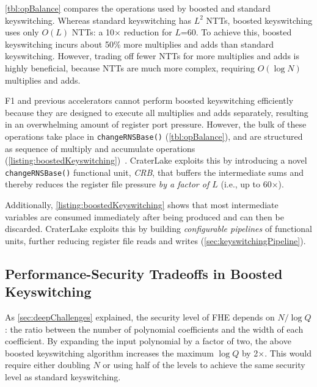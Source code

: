 \autoref{tbl:opBalance} compares the operations used by boosted and standard
keyswitching. Whereas standard keyswitching has $L^2$ NTTs, boosted
keyswitching uses only $O(L)$ NTTs: a 10$\times$ reduction for $L$=60. To
achieve this, boosted keyswitching incurs about 50\% more multiplies and adds
than standard keyswitching. However, trading off fewer NTTs for more multiplies
and adds is highly beneficial, because NTTs are much more complex, requiring
$O(\log N)$ multiplies and adds.

F1 and previous accelerators cannot perform boosted keyswitching efficiently
because they are designed to execute all multiplies and adds separately,
resulting in an overwhelming amount of register port pressure. However, the
bulk of these \mbox{operations} take place in \verb!changeRNSBase()!
(\autoref{tbl:opBalance}), and are structured as sequence of multiply and
accumulate operations
(\autoref{listing:boostedKeyswitching})~\cite{bajard:2016:full}. CraterLake
exploits this by introducing a novel \verb!changeRNSBase()! functional unit,
\emph{CRB}, that buffers the intermediate sums and thereby reduces the register
file pressure \emph{by a factor of $L$} (i.e., up to 60$\times$).

Additionally, \autoref{listing:boostedKeyswitching} shows that most
intermediate variables are consumed immediately after being produced and can
then be discarded. CraterLake exploits this by building \emph{configurable
pipelines} of functional units, further reducing register file reads and writes
(\autoref{sec:keyswitchingPipeline}).

\subsection{Performance-Security Tradeoffs in Boosted Keyswitching}
\label{sec:boostedSecurity}

As \autoref{sec:deepChallenges} explained, the security level of FHE depends on
$N/\log Q$: the ratio between the number of polynomial coefficients and the width
of each coefficient. By expanding the input polynomial by a factor of two, the
above boosted keyswitching algorithm increases the maximum $\log Q$ by 2$\times$.
This would require either doubling $N$ or using half of the levels to achieve
the same security level as standard keyswitching.

